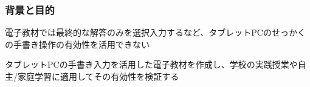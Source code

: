 \documentclass[dvipdfmx, 14pt]{beamer}
\begin{document}
\begin{frame}
  \frametitle{背景と目的}
  \begin{center}
    電子教材では最終的な解答のみを選択入力するなど、タブレットPCのせっかくの手書き操作の有効性を活用できない
  \end{center}

  \begin{center}
  \end{center}

  \begin{center}
    タブレットPCの手書き入力を活用した電子教材を作成し、学校の実践授業や自主/家庭学習に適用してその有効性を検証する
  \end{center}
\end{frame}
\end{document}
